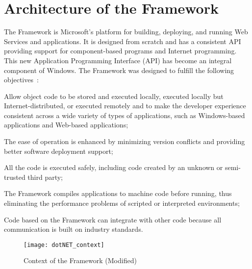 \section{Architecture of the \dotNET Framework}
\label{sec:OverviewDotNetArchitecture}
The \dotNET Framework is Microsoft's platform for building, deploying, and running Web Services and applications. It is designed from scratch and has a consistent API providing support for component-based programs and Internet programming.
This new Application Programming Interface (API) has become an integral component of Windows. The \dotNET Framework was designed to fulfill the following objectives~\cite{Microsoft03-1}:

\begin{description}[noitemsep, style=nextline]
  \item[Consistency] Allow object code to be stored and executed locally, executed locally but Internet-distributed, or executed remotely and to make the developer experience consistent across a wide variety of types of applications, such as Windows-based applications and Web-based applications;
  \item[Operability] The ease of operation is enhanced by minimizing version conflicts and providing better software deployment support;
  \item[Security] All the code is executed safely, including code created by an unknown or semi-trusted third party;
  \item[Efficiency] The \dotNET Framework compiles applications to machine code before running, thus eliminating the performance problems of scripted or interpreted environments;
  \item[Interoperability] Code based on the \dotNET Framework can integrate with other code because all communication is built on industry standards.
\end{description}

\begin{figure}
 \centering
 \texttt{[image: dotNET\_context]}
 \caption[Context of the \dotNET framework]{Context of the \dotNET Framework (Modified)~\cite{Microsoft03-1}}
 \label{fig:dotNET_context}
\end{figure}

